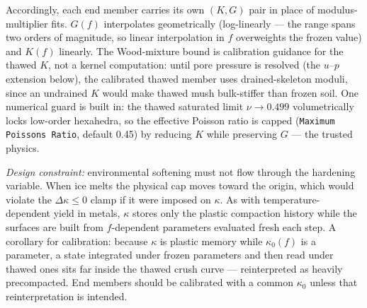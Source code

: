 \documentclass[12pt]{article}
\begin{document}
Accordingly, each end member carries its own $(K, G)$ pair in place
of modulus-multiplier fits. $G(f)$ interpolates geometrically
(log-linearly --- the range spans two orders of magnitude, so linear
interpolation in $f$ overweights the frozen value) and $K(f)$
linearly. The Wood-mixture bound is calibration guidance for the
thawed $K$, not a kernel computation: until pore pressure is
resolved (the $u$--$p$ extension below), the calibrated thawed
member uses drained-skeleton moduli, since an undrained $K$ would
make thawed mush bulk-stiffer than frozen soil. One numerical guard
is built in: the thawed saturated limit $\nu \to 0.499$
volumetrically locks low-order hexahedra, so the effective Poisson
ratio is capped (\texttt{Maximum Poissons Ratio}, default 0.45) by
reducing $K$ while preserving $G$ --- the trusted physics.

\emph{Design constraint:} environmental softening must not flow
through the hardening variable. When ice melts the physical cap
moves toward the origin, which would violate the
$\Delta\kappa \le 0$ clamp if it were imposed on $\kappa$. As with
temperature-dependent yield in metals, $\kappa$ stores only the
plastic compaction history while the surfaces are built from
$f$-dependent parameters evaluated fresh each step. A corollary for
calibration: because $\kappa$ is plastic memory while $\kappa_0(f)$
is a parameter, a state integrated under frozen parameters and then
read under thawed ones sits far inside the thawed crush curve ---
reinterpreted as heavily precompacted. End members should be
calibrated with a common $\kappa_0$ unless that reinterpretation is
intended.
\end{document}
